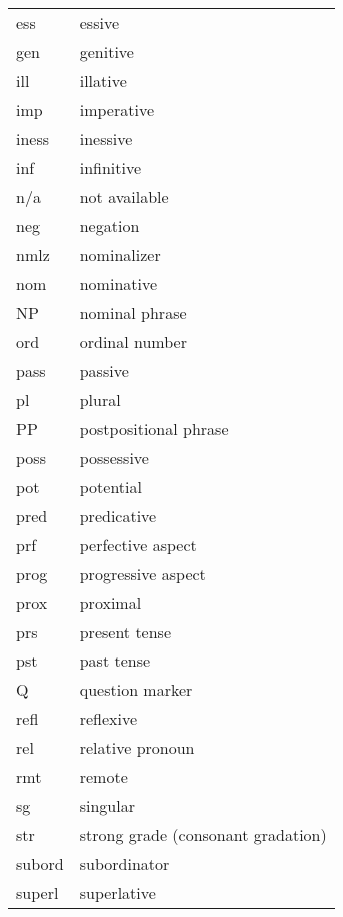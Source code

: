 \begin{longtable}{ll}
{ess}	& essive \\
{gen}	& genitive \\
{ill}	& illative \\
{imp}	& imperative \\
{iness}	& inessive \\
{inf}	& infinitive \\
n/a	& not available \\
{neg}	& negation \\
{nmlz}	& nominalizer \\
{nom}	& nominative \\
NP&nominal phrase\\
{ord}	& ordinal number \\
{pass}	& passive \\
{pl}	& plural \\
PP&postpositional phrase\\
{poss}	& possessive \\
{pot}	& potential \\
{pred} & predicative\\
{prf}	& perfective aspect \\
{prog}	& progressive aspect \\
{prox}	& proximal \\
{prs}	& present tense \\
{pst}	& past tense \\
{Q}	& question marker \\
{refl}	& reflexive\\
{rel}	& relative pronoun \\
{rmt}	& remote \\
{sg}	& singular \\
str		&strong grade (consonant gradation) \\
{subord}& subordinator \\
{superl}& superlative \\

\end{longtable}
